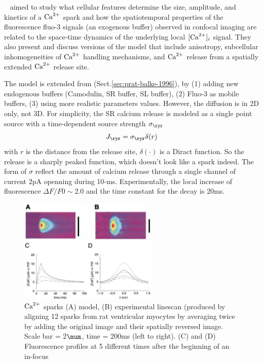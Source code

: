 ~\citep{smith1998} aimed to study what cellular features determine the size,
amplitude, and kinetics of a ${\text{Ca}^{2+}}$ spark and how the spatiotemporal properties
of the fluorescence fluo-3 signals (an exogenous buffer) observed in confocal
imaging are related to the space-time dynamics of the underlying local $[{\text{Ca}^{2+}}]_i$
signal. They also present and discuss versions of the model that include
anisotropy, subcellular inhomogeneities of ${\text{Ca}^{2+}}$ handling mechanisms, and ${\text{Ca}^{2+}}$
release from a spatially extended ${\text{Ca}^{2+}}$ release site. 

The model is extended from \citep{pratusevich1996}
(Sect.\ref{sec:prat-balke-1996}), by (1) adding new endogenous buffers
(Camodulin, SR buffer, SL buffer), (2) Fluo-3 as mobile buffers, (3) using more
realistic parameters values. However, the diffusion is in 2D only, not 3D. For
simplicity, the SR calcium release is modeled as a single point source with a
time-dependent source strength $\sigma_\ryr$
\begin{equation}
J_\ryr = \sigma_\ryr \delta(r)
\end{equation}
with $r$ is the distance from the release site, $\delta(\cdot)$ is a Diract
function. So the release is a sharply peaked function, which doesn't look like a
spark indeed. The form of $\sigma$ reflect the amount of calcium release through
a single channel of current 2pA openning during 10-ms. Experimentally, the local
increase of fluorescence $\Delta F/F0 \sim 2.0$ and the time constant for the
decay is 20ms. 

\begin{figure}[hbt]
  \centerline{\includegraphics[height=5cm,
    angle=0]{./images/smith_spark.eps}}
  \caption{${\text{Ca}^{2+}}$ sparks (A) model, (B) experimental linescan (produced
    by aligning 12 sparks from rat ventricular myocytes by averaging
    twice by adding the original image and their spatially reversed
    image. Scale bar = 2$\mum$, time = 200ms (left to right). (C) and (D)
    Fluorescence profiles at 5 different times after the beginning of an
    in-focus}
  \label{fig:smith_spark}
\end{figure}

